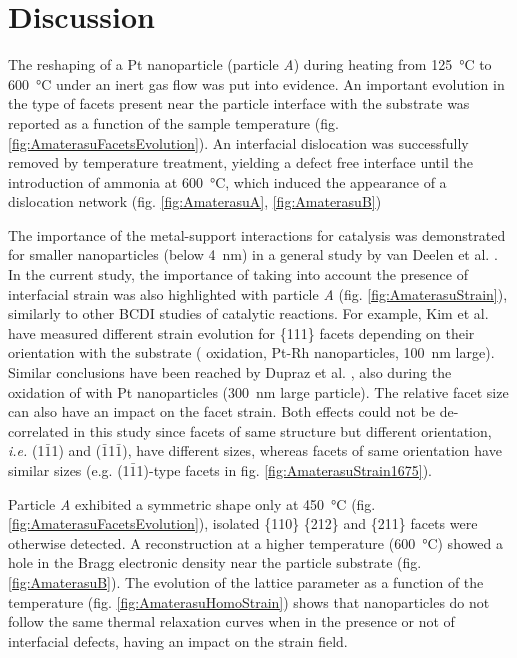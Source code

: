 \section{Discussion}

The reshaping of a Pt nanoparticle (particle \textit{A}) during heating from \qty{125}{\degreeCelsius} to \qty{600}{\degreeCelsius} under an inert gas flow was put into evidence.
An important evolution in the type of facets present near the particle interface with the substrate was reported as a function of the sample temperature (fig. \ref{fig:AmaterasuFacetsEvolution}).
An interfacial dislocation was successfully removed by temperature treatment, yielding a defect free interface until the introduction of ammonia at \qty{600}{\degreeCelsius}, which induced the appearance of a dislocation network (fig. \ref{fig:AmaterasuA}, \ref{fig:AmaterasuB})

The importance of the metal-support interactions for catalysis was demonstrated for smaller nanoparticles (below \qty{4}{\nm}) in a general study by van Deelen et al. \parencite*{vanDeelen2019}.
In the current study, the importance of taking into account the presence of interfacial strain was also highlighted with particle \textit{A} (fig. \ref{fig:AmaterasuStrain}), similarly to other BCDI studies of catalytic reactions.
For example, Kim et al. \parencite*{Kim2021} have measured different strain evolution for \{111\} facets depending on their orientation with the  substrate ( oxidation, Pt-Rh nanoparticles, \qty{100}{\nm} large).
Similar conclusions have been reached by Dupraz et al. \parencite*{Dupraz2022}, also during the oxidation of  with Pt nanoparticles (\qty{300}{\nm} large particle).
The relative facet size can also have an impact on the facet strain.
Both effects could not be de-correlated in this study since facets of same structure but different orientation, \textit{i.e.} (1$\bar{1}$1) and ($\bar{1}$1$\bar{1}$), have different sizes, whereas facets of same orientation have similar sizes (e.g. (1$\bar{1}$1)-type facets in fig. \ref{fig:AmaterasuStrain1675}).

Particle \textit{A} exhibited a symmetric shape only at \qty{450}{\degreeCelsius} (fig. \ref{fig:AmaterasuFacetsEvolution}), isolated \{110\} \{212\} and \{211\} facets were otherwise detected.
A reconstruction at a higher temperature (\qty{600}{\degreeCelsius}) showed a hole in the Bragg electronic density near the particle substrate (fig. \ref{fig:AmaterasuB}).
The evolution of the lattice parameter as a function of the temperature (fig. \ref{fig:AmaterasuHomoStrain}) shows that nanoparticles do not follow the same thermal relaxation curves when in the presence or not of interfacial defects, having an impact on the strain field.

